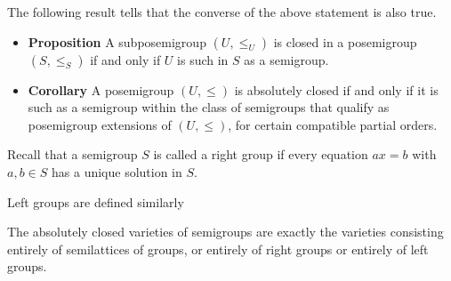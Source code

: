 \documentclass[notes=show]{beamer}
\makeatletter
\newenvironment{stepitemize}{\begin{itemize}[<+->]}{\end{itemize} }
\newenvironment{stepitemizewithalert}{\begin{itemize}[<+-| alert@+>]}{\end{itemize} }
\makeatother
\begin{document}
\begin{frame}%


The following result tells that the converse of the above statement is also
true.\bigskip

\begin{stepitemize}
\item \textbf{Proposition} A subposemigroup $(U,\leq _{U})$ is closed in a
posemigroup $(S,\leq _{S})$ if and only if $U$ is such in $S$ as a
semigroup.\bigskip
\end{stepitemize}

\begin{stepitemizewithalert}
\item \textbf{Corollary} A posemigroup $(U,\leq )$ is absolutely closed if
and only if it is such as a semigroup within the class of semigroups that
qualify as posemigroup extensions of $(U,\leq )$, for certain compatible
partial orders.
\end{stepitemizewithalert}

\transboxout%
\end{frame}%

\begin{frame}%


Recall that a semigroup $S$ is called a right group if every equation $ax=b$
with $a,b\in S$ has a unique solution in $S$.\bigskip

Left groups are defined similarly\bigskip

\begin{theorem}[Higgins]
The absolutely closed varieties of semigroups are exactly the varieties
consisting entirely of semilattices of groups, or entirely of right groups
or entirely of left groups.
\end{theorem}

\transboxout%
\end{frame}%
\end{document}

